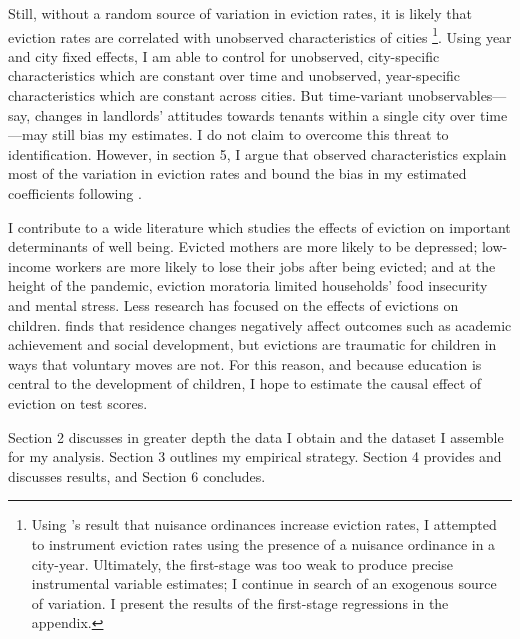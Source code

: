 \documentclass[12pt]{article}
\begin{document}
Still, without a random source of variation in eviction rates, it is likely that eviction rates are correlated with unobserved characteristics of cities \footnote{Using \cite{kroeger_nuisance_2020}'s result that nuisance ordinances increase eviction rates, I attempted to instrument eviction rates using the presence of a nuisance ordinance in a city-year. Ultimately, the first-stage was too weak to produce precise instrumental variable estimates; I continue in search of an exogenous source of variation. I present the results of the first-stage regressions in the appendix.}. Using year and city fixed effects, I am able to control for unobserved, city-specific characteristics which are constant over time and unobserved, year-specific characteristics which are constant across cities. But time-variant unobservables—say, changes in landlords' attitudes towards tenants within a single city over time—may still bias my estimates. I do not claim to overcome this threat to identification. However, in section 5, I argue that observed characteristics explain most of the variation in eviction rates and bound the bias in my estimated coefficients following \cite{oster_unobservable_2019}.

I contribute to a wide literature which studies the effects of eviction on important determinants of well being. Evicted mothers are more likely to be depressed; low-income workers are more likely to lose their jobs after being evicted; and at the height of the pandemic, eviction moratoria limited households’ food insecurity and mental stress\citep{desmond_housing_2016, desmond_evictions_2015, an_covid-19_2021}. Less research has focused on the effects of evictions on children. \cite{grigg_school_2012} finds that residence changes negatively affect outcomes such as academic achievement and social development, but evictions are traumatic for children in ways that voluntary moves are not. For this reason, and because education is central to the development of children, I hope to estimate the causal effect of eviction on test scores.

Section 2 discusses in greater depth the data I obtain and the dataset I assemble for my analysis. Section 3 outlines my empirical strategy. Section 4 provides and discusses results, and Section 6 concludes.
\end{document}
